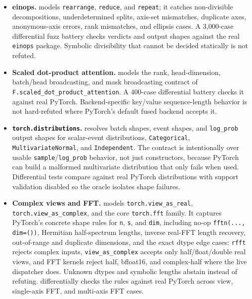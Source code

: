 \documentclass[11pt]{article}
\begin{document}
\begin{itemize}[leftmargin=2em]
  \item \textbf{einops.}   models
  \texttt{rearrange}, \texttt{reduce}, and \texttt{repeat}; it catches
  non-divisible decompositions, underdetermined splits, axis-set mismatches,
  duplicate axes, anonymous-axis errors, rank mismatches, and ellipsis cases.
  A 3,000-case differential fuzz battery checks verdicts and output shapes
  against the real \texttt{einops} package.  Symbolic divisibility that cannot
  be decided statically is not refuted.
  \item \textbf{Scaled dot-product attention.}  
  models the rank, head-dimension, batch/head broadcasting, and mask
  broadcasting contract of \texttt{F.scaled\_dot\_product\_attention}.  A
  400-case differential battery checks it against real PyTorch.  Backend-specific
  key/value sequence-length behavior is not hard-refuted where PyTorch's default
  fused backend accepts it.
  \item \textbf{\texttt{torch.distributions}.}
   resolves batch shapes, event shapes, and
  \texttt{log\_prob} output shapes for scalar-event distributions,
  \texttt{Categorical}, \texttt{MultivariateNormal}, and
  \texttt{Independent}.  The contract is intentionally over usable
  \texttt{sample}/\texttt{log\_prob} behavior, not just constructors, because
  PyTorch can build a malformed multivariate distribution that only fails when
  used.  Differential tests compare against real PyTorch distributions with
  support validation disabled so the oracle isolates shape failures.
  \item \textbf{Complex views and FFT.}
   models \texttt{torch.view\_as\_real},
  \texttt{torch.view\_as\_complex}, and the core \texttt{torch.fft} family.
  It captures PyTorch's concrete shape rules for \texttt{n}, \texttt{s}, and
  \texttt{dim}, including no-op \texttt{fftn(..., dim=())}, Hermitian
  half-spectrum lengths, inverse real-FFT length recovery, out-of-range and
  duplicate dimensions, and the exact dtype edge cases: \texttt{rfft} rejects
  complex inputs, \texttt{view\_as\_complex} accepts only half/float/double
  real views, and FFT kernels reject half, bfloat16, and complex-half where the
  live dispatcher does.  Unknown dtypes and symbolic lengths abstain instead of
  refuting.   differentially checks the rules
  against real PyTorch across view, single-axis FFT, and multi-axis FFT cases.

\end{itemize}
\end{document}
